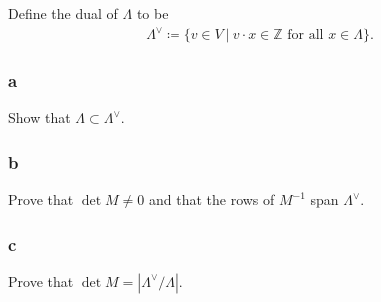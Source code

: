 Define the dual of \(\Lambda\) to be
\begin{align*}
\Lambda ^\vee\coloneqq\{v \in V {~\mathrel{\Big|}~}v \cdot x \in {\mathbb{Z}}\text{ for all } x \in \Lambda
\}
.\end{align*}

\hypertarget{a-103}{%
\subsubsection{a}\label{a-103}}

Show that \(\Lambda \subset \Lambda ^\vee\).

\hypertarget{b-93}{%
\subsubsection{b}\label{b-93}}

Prove that \(\det M \neq 0\) and that the rows of \(M^{-1}\) span
\(\Lambda^\vee\).

\hypertarget{c-57}{%
\subsubsection{c}\label{c-57}}

Prove that \(\det M = |\Lambda^\vee/\Lambda|\).


